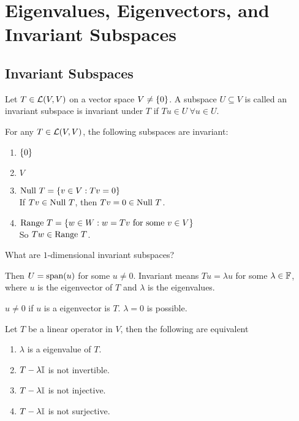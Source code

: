 \section{Eigenvalues, Eigenvectors, and
Invariant Subspaces}
\subsection{Invariant Subspaces}
\begin{definition}
    Let $T \in \mathcal L(V,V)$ on a vector space $V \neq \left\{ 0 \right\}$. A subspace $U \subseteq V$ is called an invariant subspace is invariant under $T$ if $Tu \in U \ \forall u \in U$.
\end{definition}
\begin{example}
    For any $T \in \mathcal L(V,V)$, the following subspaces are invariant:
    \begin{enumerate}
        \item $\left\{ 0 \right\}$
        \item $V$
        \item $\text{Null } T = \left\{ v \in V : Tv = 0 \right\}$ \\
        If $Tv \in \text{Null } T$, then $Tv = 0 \in \text{Null } T$.
        \item $\text{Range } T = \left\{ w \in W : w = Tv \text{ for some } v \in V \right\}$ \\
        So $Tw \in \text{Range } T$.
    \end{enumerate}
\end{example}
\begin{question}
    What are $1$-dimensional invariant subspaces?  
\end{question}
\begin{answer}
Then $U = \text{span}(u)$ for some $u \neq 0$. Invariant means $Tu = \lambda u$ for some $\lambda \in  \mathbb F$, where $u$ is the eigenvector of $T$ and $\lambda$ is the eigenvalues.
\end{answer}
\begin{remark}
    $u \neq 0$ if $u$ is a eigenvector is $T$. $\lambda = 0$ is possible.
\end{remark}
\begin{proposition} Let $T$ be a linear operator in $V$, then the following are equivalent
\begin{enumerate}
    \item $\lambda$ is a eigenvalue of $T$.
    \item $T - \lambda\mathbb I$ is not invertible.
    \item $T - \lambda \mathbb I$ is not injective.
    \item $T - \lambda \mathbb I$ is not surjective.
\end{enumerate}
\end{proposition}
